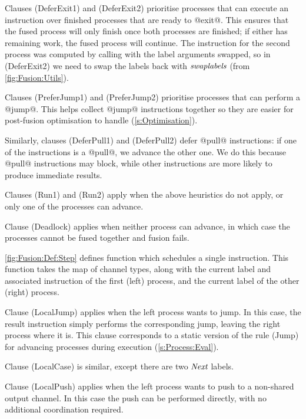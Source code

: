 Clauses (DeferExit1) and (DeferExit2) prioritise processes that can execute an instruction over finished processes that are ready to @exit@.
This ensures that the fused process will only finish once both processes are finished; if either has remaining work, the fused process will continue.
The instruction for the second process was computed by calling  with the label arguments swapped, so in (DeferExit2) we need to swap the labels back with $\textit{swaplabels}$ (from \autoref{fig:Fusion:Utils}).

Clauses (PreferJump1) and (PreferJump2) prioritise processes that can perform a @jump@.
This helps collect @jump@ instructions together so they are easier for post-fusion optimisation to handle (\autoref{s:Optimisation}).

Similarly, clauses (DeferPull1) and (DeferPull2) defer @pull@ instructions: if one of the instructions is a @pull@, we advance the other one. We do this because @pull@ instructions may block, while other instructions are more likely to produce immediate results.

Clauses (Run1) and (Run2) apply when the above heuristics do not apply, or only one of the processes can advance.

Clause (Deadlock) applies when neither process can advance, in which case the processes cannot be fused together and fusion fails.




\smallskip
\autoref{fig:Fusion:Def:Step} defines function  which schedules a single instruction. This function takes the map of channel types, along with the current label and associated instruction of the first (left) process, and the current label of the other (right) process.

Clause (LocalJump) applies when the left process wants to jump.
In this case, the result instruction simply performs the corresponding jump, leaving the right process where it is.
This clause corresponds to a static version of the rule (Jump) for advancing processes during execution (\autoref{s:Process:Eval}).

Clause (LocalCase) is similar, except there are two $\textit{Next}$ labels.

Clause (LocalPush) applies when the left process wants to push to a non-shared output channel.
In this case the push can be performed directly, with no additional coordination required.

